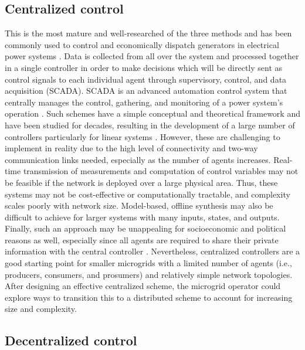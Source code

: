 \documentclass[final,3p,times]{elsarticle}
\begin{document}
\subsection{Centralized control}

This is the most mature and well-researched of the three methods and has been commonly used to control and economically dispatch generators in electrical power systems \cite{su2015}. Data is collected from all over the system and processed together in a single controller in order to make decisions which will be directly sent as control signals to each individual agent through supervisory, control, and data acquisition (SCADA). SCADA is an advanced automation control system that centrally manages the control, gathering, and monitoring of a power system's operation \cite{scada}. Such schemes have a simple conceptual and theoretical framework and have been studied for decades, resulting in the development of a large number of controllers particularly for linear systems \cite{farina2012}. However, these are challenging to implement in reality due to the high level of connectivity and two-way communication links needed, especially as the number of agents increases. Real-time transmission of measurements and computation of control variables may not be feasible if the network is deployed over a large physical area. Thus, these systems may not be cost-effective or computationally tractable, and complexity scales poorly with network size. Model-based, offline synthesis may also be difficult to achieve for larger systems with many inputs, states, and outputs. Finally, such an approach may be unappealing for socioeconomic and political reasons as well, especially since all agents are required to share their private information with the central controller \cite{farina2012}. Nevertheless, centralized controllers are a good starting point for smaller microgrids with a limited number of agents (i.e., producers, consumers, and prosumers) and relatively simple network topologies. After designing an effective centralized scheme, the microgrid operator could explore ways to transition this to a distributed scheme to account for increasing size and complexity.

\subsection{Decentralized control}
\end{document}
